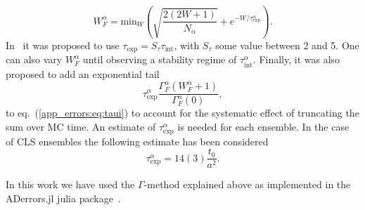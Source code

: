 \begin{equation}
W_F^{\alpha}=\textrm{min}_W\left(\sqrt{\frac{2(2W+1)}{N_{\alpha}}}+e^{-W/\tau_{\textrm{exp}}^{\alpha}}\right).
\end{equation}
In~\citep{Wolff:2003sm} it was proposed to use $\tau_{\textrm{exp}}=S_{\tau}\tau_{\textrm{int}}$, with $S_{\tau}$ some value between 2 and 5. One can also vary $W_F^{\alpha}$ until observing a stability regime of $\tau_{\textrm{int}}^{\alpha}$. Finally, it was also proposed to add an exponential tail~\citep{Schaefer:2010hu}
\begin{equation}
\tau_{\textrm{exp}}^{\alpha}\frac{\Gamma_F^{\alpha}(W_F^{\alpha}+1)}{\Gamma_F^{\alpha}(0)},
\end{equation}
to eq.~(\ref{app_errors:eq:taui}) to account for the systematic effect of truncating the sum over MC time. An estimate of $\tau_{\textrm{exp}}^{\alpha}$ is needed for each ensemble. In the case of CLS ensembles the following estimate has been considered~\citep{Bruno:2014jqa}
\begin{equation}
\tau_{\textrm{exp}}^{\alpha}=14(3)\frac{t_0}{a^2}.
\end{equation}

In this work we have used the $\Gamma$-method explained above as implemented in the ADerrors.jl julia package~\citep{Ramos:2020scv}.



